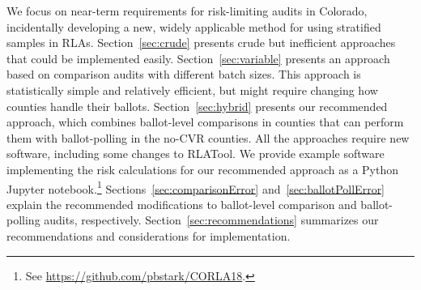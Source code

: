 \documentclass[runningheads]{llncs}
\begin{document}
We focus on near-term requirements for risk-limiting audits in Colorado, incidentally
developing a new, widely applicable method for using stratified samples in RLAs.
Section~\ref{sec:crude} presents crude but inefficient approaches
that could be implemented easily.
Section~\ref{sec:variable}
presents an approach based on comparison audits with different batch sizes.
This approach is statistically simple and relatively efficient, but might require changing how counties
handle their ballots.
Section~\ref{sec:hybrid} presents our recommended approach, which combines ballot-level
comparisons in counties that can perform them with ballot-polling in the no-CVR counties.
All the approaches require new software, including some changes to RLATool.
We provide example software implementing the risk calculations for
our recommended approach as a Python Jupyter notebook.\footnote{%
 See \url{https://github.com/pbstark/CORLA18}.
}
Sections~\ref{sec:comparisonError} and~\ref{sec:ballotPollError} explain the recommended
modifications to ballot-level comparison and ballot-polling audits, respectively. 
Section~\ref{sec:recommendations} summarizes our recommendations and
considerations for implementation.
\end{document}

